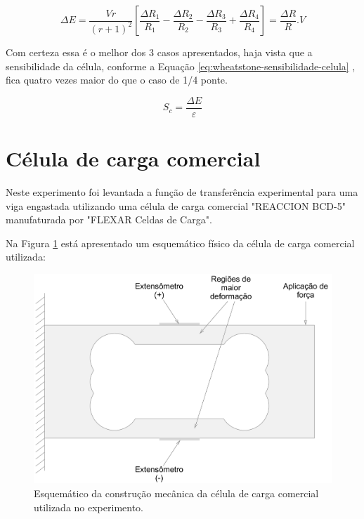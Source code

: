 \documentclass[a4paper]{instrumentacao}
\begin{document}
\begin{equation}
	\Delta E=\frac{V r}{(r+1)^2}\left [ \frac{\Delta R_1}{R_1}-\frac{\Delta R_2}{R_2}-\frac{\Delta R_3}{R_3}+\frac{\Delta R_4}{R_4} \right ]=\frac{\Delta R}{R}.V
	\label{eq:wheatstone-deltaE-completa}
\end{equation}

Com certeza essa é o melhor dos 3 casos apresentados, haja vista que a sensibilidade da célula, conforme a Equação \ref{eq:wheatstone-sensibilidade-celula} , fica quatro vezes maior do que o caso de 1/4 ponte.

\begin{equation}
	S_c=\frac{\Delta E}{\varepsilon}
	\label{eq:wheatstone-sensibilidade-celula}
\end{equation}

\section{Célula de carga comercial}

Neste experimento foi levantada a função de transferência experimental para uma viga engastada utilizando uma célula de carga comercial "REACCION BCD-5" manufaturada por "FLEXAR Celdas de Carga".

Na Figura \ref{fig:celula-comercial-esquema-fisico} está apresentado um esquemático físico da célula de carga comercial utilizada:

\begin{figure}[H]
\center
\includegraphics[width=\textwidth]{CelulaComercial.pdf}
\caption{Esquemático da construção mecânica da célula de carga comercial utilizada no experimento.}
\label{fig:celula-comercial-esquema-fisico}
\end{figure}
\end{document}
